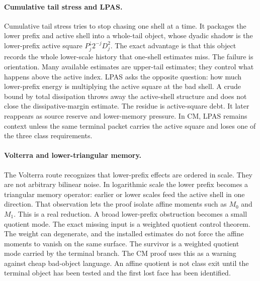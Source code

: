 \paragraph{Cumulative tail stress and LPAS.}
Cumulative tail stress tries to stop chasing one shell at a time.
It packages the lower prefix and active shell into a whole-tail object, whose
dyadic shadow is the lower-prefix active square \(P_j^\downarrow2^{-j}D_j^2\).
The exact advantage is that this object records the whole lower-scale history
that one-shell estimates miss.
The failure is orientation.
Many available estimates are upper-tail estimates; they control what happens
above the active index.
LPAS asks the opposite question: how much lower-prefix energy is multiplying
the active square at the bad shell.
A crude bound by total dissipation throws away the active-shell structure and
does not close the dissipative-margin estimate.
The residue is active-square debt.
It later reappears as source reserve and lower-memory pressure.
In CM, LPAS remains context unless the same terminal packet carries the active
square and loses one of the three class requirements.

\paragraph{Volterra and lower-triangular memory.}
The Volterra route recognizes that lower-prefix effects are ordered in scale.
They are not arbitrary bilinear noise.
In logarithmic scale the lower prefix becomes a triangular memory operator:
earlier or lower scales feed the active shell in one direction.
That observation lets the proof isolate affine moments such as \(M_0\) and
\(M_1\).
This is a real reduction.
A broad lower-prefix obstruction becomes a small quotient mode.
The exact missing input is a weighted quotient control theorem.
The weight can degenerate, and the installed estimates do not force the affine
moments to vanish on the same surface.
The survivor is a weighted quotient mode carried by the terminal branch.
The CM proof uses this as a warning against cheap bad-object language.
An affine quotient is not class exit until the terminal object has been tested
and the first lost face has been identified.

